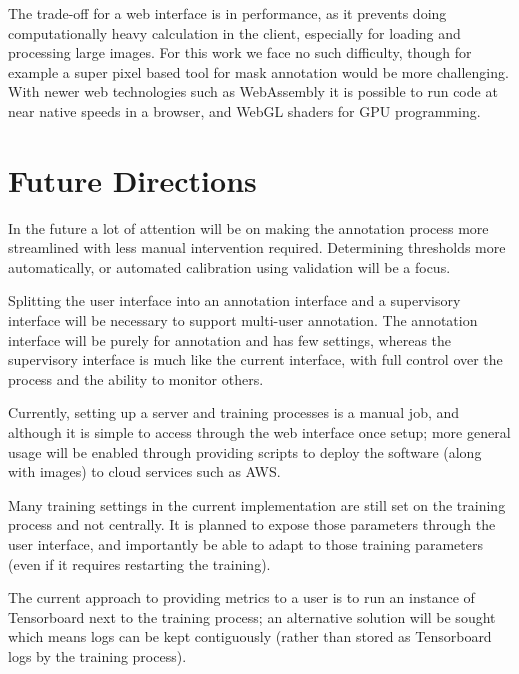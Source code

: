 The trade-off for a web interface is in performance, as it prevents doing computationally heavy calculation in the client, especially for loading and processing large images. For this work we face no such difficulty, though for example a super pixel based tool for mask annotation would be more challenging. With newer web technologies such as WebAssembly \cite{Haas2017} it is possible to run code at near native speeds in a browser, and WebGL shaders for GPU programming.



\section{Future Directions}
\label{sec:design_future_direction}

In the future a lot of attention will be on making the annotation process more streamlined with less manual intervention required. Determining thresholds more automatically, or automated calibration using validation will be a focus.

Splitting the user interface into an annotation interface and a supervisory interface will be necessary to support multi-user annotation. The annotation interface will be purely for annotation and has few settings, whereas the supervisory interface is much like the current interface, with full control over the process and the ability to monitor others.

Currently, setting up a server and training processes is a manual job, and although it is simple to access through the web interface once setup; more general usage will be enabled through providing scripts to deploy the software (along with images) to cloud services such as \gls{AWS}. 

 Many training settings in the current implementation are still set on the training process and not centrally. It is planned to expose those parameters through the user interface, and importantly be able to adapt to those training parameters (even if it requires restarting the training).

The current approach to providing metrics to a user is to run an instance of Tensorboard next to the training process; an alternative solution will be sought which means logs can be kept contiguously (rather than stored as Tensorboard logs by the training process).

